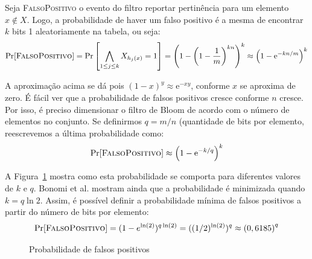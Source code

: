Seja \textsc{FalsoPositivo} o evento do filtro reportar pertinência para um elemento $x \notin X$. Logo, a probabilidade de haver um falso positivo é a mesma de encontrar $k$ bits 1 aleatoriamente na tabela, ou seja:
\[
\Pr[\textsc{FalsoPositivo}] = \Pr\left[\bigwedge_{1 \leq j \leq k} X_{h_j(x)} = 1 \right] = \left( 1 - \left( 1 - \frac{1}{m}\right)^{kn} \right)^k \approx \left( 1 - \mathrm{e} ^{-kn/m} \right)^k
\]

A aproximação acima se dá pois $(1 - x)^y \approx \mathrm{e}^{-xy}$, conforme $x$ se aproxima de zero. É fácil ver que a probabilidade de falsos positivos cresce conforme $n$ cresce. Por isso, é preciso dimensionar o filtro de Bloom de acordo com o número de elementos no conjunto. Se definirmos $q = m/n$ (quantidade de bits por elemento, reescrevemos a última probabilidade como:
\[
\Pr[\textsc{FalsoPositivo}] \approx \left( 1 - \mathrm{e} ^{-k/q} \right)^k
\]

A Figura~\ref{fig:probfalso1} mostra como esta probabilidade se comporta para diferentes valores de $k$ e $q$. Bonomi et al. \cite{bonomi2006improved} mostram ainda que a probabilidade é minimizada quando $k = q \ln 2$. Assim, é possível definir a probabilidade mínima de falsos positivos a partir do número de bits por elemento:
\[
\Pr[\textsc{FalsoPositivo}] = (1-e^{\ln(2)}) ^ {q \ln(2)} = ((1/2)^{\ln(2)})^q \approx \left( 0,6185 \right)^q
\]

\begin{figure}[!htbp]
\centering
{}
\caption{Probabilidade de falsos positivos}
\label{fig:probfalso1}
\end{figure}

